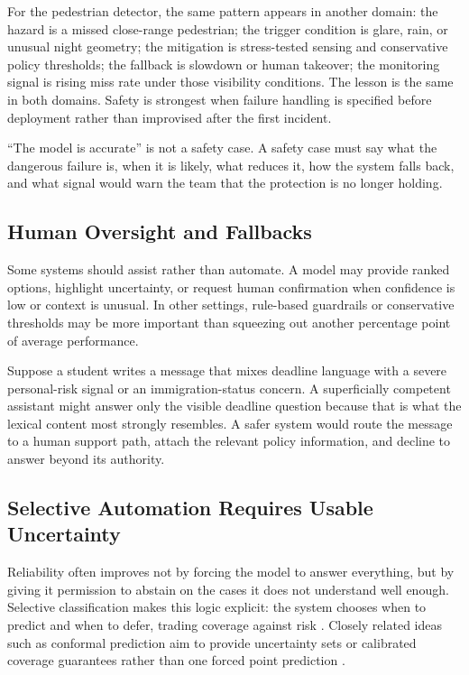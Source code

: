 For the pedestrian detector, the same pattern appears in another domain: the hazard is a missed close-range pedestrian; the trigger condition is glare, rain, or unusual night geometry; the mitigation is stress-tested sensing and conservative policy thresholds; the fallback is slowdown or human takeover; the monitoring signal is rising miss rate under those visibility conditions. The lesson is the same in both domains. Safety is strongest when failure handling is specified before deployment rather than improvised after the first incident.

\begin{evidencebox}
``The model is accurate'' is not a safety case. A safety case must say what the dangerous failure is, when it is likely, what reduces it, how the system falls back, and what signal would warn the team that the protection is no longer holding.
\end{evidencebox}

\subsection{Human Oversight and Fallbacks}

Some systems should assist rather than automate. A model may provide ranked options, highlight uncertainty, or request human confirmation when confidence is low or context is unusual. In other settings, rule-based guardrails or conservative thresholds may be more important than squeezing out another percentage point of average performance.

\begin{example}
Suppose a student writes a message that mixes deadline language with a severe personal-risk signal or an immigration-status concern. A superficially competent assistant might answer only the visible deadline question because that is what the lexical content most strongly resembles. A safer system would route the message to a human support path, attach the relevant policy information, and decline to answer beyond its authority.
\end{example}

\subsection{Selective Automation Requires Usable Uncertainty}

Reliability often improves not by forcing the model to answer everything, but by giving it permission to abstain on the cases it does not understand well enough. Selective classification makes this logic explicit: the system chooses when to predict and when to defer, trading coverage against risk \citep{geifman2017}. Closely related ideas such as conformal prediction aim to provide uncertainty sets or calibrated coverage guarantees rather than one forced point prediction \citep{shafer2008}.


